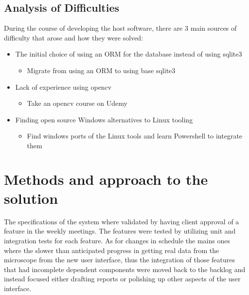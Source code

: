 \documentclass[12pt]{article}
\begin{document}
\subsection{Analysis of Difficulties}
During the course of developing the host software, there are 3 main sources of difficulty that arose and how they were solved:
\begin{itemize}
	\item The initial choice of using an ORM for the database instead of using sqlite3
	      \begin{itemize}
		      \item Migrate from using an ORM to using base sqlite3
	      \end{itemize}
	\item Lack of experience using opencv
	      \begin{itemize}
		      \item Take an opencv course on Udemy
	      \end{itemize}
	\item Finding open source Windows alternatives to Linux tooling
	      \begin{itemize}
		      \item Find windows ports of the Linux tools and learn Powershell to integrate them
	      \end{itemize}
\end{itemize}
\section{Methods and approach to the solution}
The specifications of the system where validated by having client approval of a feature in the weekly meetings. The features were tested by utilizing unit and integration tests for each feature. As for changes in schedule the mains ones where the slower than anticipated progress in getting real data from the microscope from the new user interface, thus the integration of those features that had incomplete dependent components were moved back to the backlog and instead focused either drafting reports or polishing up other aspects of the user interface.
\end{document}
